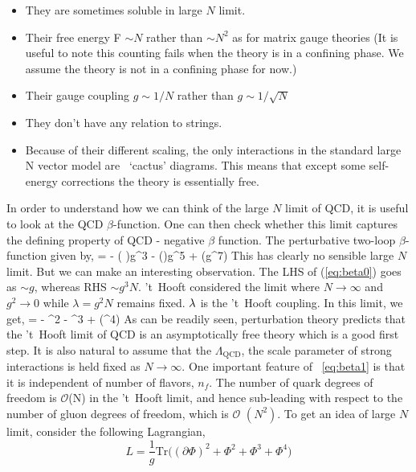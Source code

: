 \begin{itemize}
\item They are sometimes soluble in large $N$ limit. 
\item Their free energy F $\sim N$ rather than $\sim N^2$ as for matrix gauge theories (It is useful to note this 
counting fails when the theory is in a confining phase. We assume the theory is not in a confining phase for now.)
\item Their gauge coupling $g \sim 1/N$ rather than $g \sim 1/\sqrt{N}$
\item They don't have any relation to strings. 
\item Because of their different scaling, the only interactions in the standard large N vector model are ~`cactus' diagrams. 
This means that except some self-energy corrections the theory is essentially free. 
\end{itemize} 
In order to understand how we can think of the large $N$ limit of QCD, it is useful to look at the QCD $\beta$-function. One can then check whether this limit captures the defining property of QCD - negative $\beta$ function. The perturbative 
two-loop $\beta$-function given by, 
\beq
\label{eq:beta0}
\mu {} = -  \left ( \right)g^3  -  \left (\right)g^5 + (g^7)
\eeq
This has clearly no sensible large $N$ limit. But we can make an interesting observation. The LHS of (\ref{eq:beta0}) goes as 
$ \sim g$, whereas RHS $ \sim g^3 N$. 't~Hooft considered the limit where $N \to \infty$ and $g^2 \to 0$ while $\lambda = g^2 N $ 
remains fixed. $\lambda$ is the 't~Hooft coupling. In this limit, we get, 
\beq
  \label{eq:beta1}
\mu {} = -  \lambda^2 -   \lam^3 + (\lambda^4) 
\eeq
As can be readily seen, perturbation theory predicts that the 't~Hooft limit of QCD is an asymptotically free
theory which is a good first step. It is also natural to assume that the $\Lambda_{\text{QCD}}$, 
the scale parameter of strong interactions is held fixed as $N \to \infty$. One important feature of ~\ref{eq:beta1} 
is that it is independent of number of flavors, $n_{f}$. The 
number of quark degrees of freedom is $\mathscr{O}$(N) in the
't~Hooft limit, and hence sub-leading with respect to the number of gluon degrees of freedom, 
which is $\mathscr{O}$ $(N^{2})$. 
To get an idea of large $N$ limit, consider the following Lagrangian, 
\begin{equation}
L = \frac{1}{g} \mathrm{Tr} \Bigg( (\partial \Phi)^2 + \Phi^2 + \Phi^3 + \Phi^4  \Bigg) 
\end{equation} 
